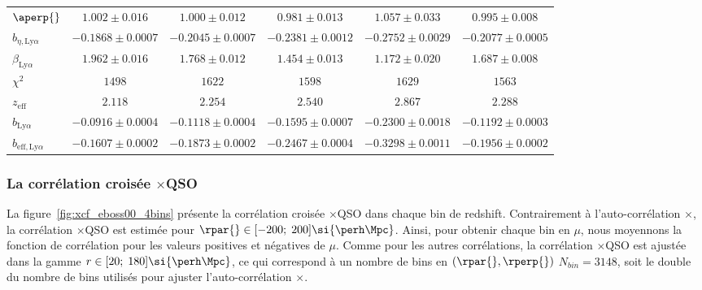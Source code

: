 \begin{table}[h]
\begin{tabular}{lccccc}
    $\aperp{} $ & $ 1.002 \pm 0.016$ & $ 1.000 \pm 0.012$ & $ 0.981 \pm 0.013$ & $ 1.057 \pm 0.033$ & $ 0.995 \pm 0.008$ \\
    $b_{\eta, \mathrm{Ly}\alpha} $ & $ -0.1868 \pm 0.0007$ & $ -0.2045 \pm 0.0007$ & $ -0.2381 \pm 0.0012$ & $ -0.2752 \pm 0.0029$ & $ -0.2077 \pm 0.0005$ \\
    $\beta_{\mathrm{Ly}\alpha} $ & $ 1.962 \pm 0.016$ & $ 1.768 \pm 0.012$ & $ 1.454 \pm 0.013$ & $ 1.172 \pm 0.020$ & $ 1.687 \pm 0.008$ \\
    \midrule
    $\chi^2$ & $ 1498 $ & $ 1622 $ & $ 1598 $ & $ 1629 $ & $ 1563 $ \\
    $z_{\mathrm{eff}}$ & $ 2.118 $ & $ 2.254 $ & $ 2.540 $ & $ 2.867 $ & $ 2.288 $ \\
    \midrule
    $b_{\mathrm{Ly}\alpha} $ & $ -0.0916 \pm 0.0004$ & $ -0.1118 \pm 0.0004$ & $ -0.1595 \pm 0.0007$ & $ -0.2300 \pm 0.0018$ & $ -0.1192 \pm 0.0003$ \\
    $b_{\mathrm{eff}, \mathrm{Ly}\alpha} $ & $ -0.1607 \pm 0.0002$ & $ -0.1873 \pm 0.0002$ & $ -0.2467 \pm 0.0004$ & $ -0.3298 \pm 0.0011$ & $ -0.1956 \pm 0.0002$ \\
    \bottomrule
  \end{tabular}
\end{table}



\subsubsection{La corrélation croisée \lya{}$\times$QSO}
La figure~\ref{fig:xcf_eboss00_4bins} présente la corrélation croisée \lya{}$\times$QSO dans chaque bin de redshift.
Contrairement à l'auto-corrélation \lya{}$\times$\lya{}, la corrélation \lya{}$\times$QSO est estimée pour $\rpar{} \in [-200;\;200] \si{\perh\Mpc}$.
Ainsi, pour obtenir chaque bin en $\mu$, nous moyennons la fonction de corrélation pour les valeurs positives et négatives de $\mu$.
Comme pour les autres corrélations, la corrélation \lya{}$\times$QSO est ajustée dans la gamme $r \in [20;\;180] \si{\perh\Mpc}$, ce qui correspond à un nombre de bins en $(\rpar{}, \rperp{})$ $N_{bin} = \num{3148}$, soit le double du nombre de bins utilisés pour ajuster l'auto-corrélation \lya{}$\times$\lya{}.

